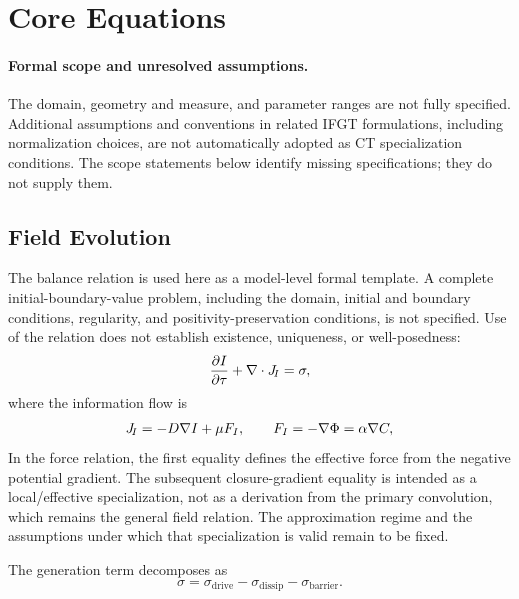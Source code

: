 
\section{Core Equations}
\label{sec:core}

\paragraph{Formal scope and unresolved assumptions.}
The domain, geometry and measure, and parameter ranges are not fully
specified. Additional assumptions and conventions in related IFGT
formulations, including normalization choices, are not automatically
adopted as CT specialization conditions. The scope statements below
identify missing specifications; they do not supply them.

\subsection{Field Evolution}

The balance relation is used here as a model-level formal template.
A complete initial-boundary-value problem, including the domain,
initial and boundary conditions, regularity, and positivity-preservation
conditions, is not specified. Use of the relation does not establish
existence, uniqueness, or well-posedness:
\begin{equation}
  \frac{\partial I}{\partial\tau} + \nabla\cdot J_{\!I} = \sigma,
  \label{eq:I_evolution}
\end{equation}
where the information flow is
\begin{equation}
  J_{\!I} = -D\nabla I + \mu F_I, \qquad F_I = -\nabla\Phi = \alpha\nabla C,
  \label{eq:JI}
\end{equation}
In the force relation, the first equality defines the effective force
from the negative potential gradient. The subsequent closure-gradient
equality is intended as a local/effective specialization, not as a
derivation from the primary convolution, which remains the general
field relation. The approximation regime and the assumptions under
which that specialization is valid remain to be fixed.

The generation term decomposes as
\begin{equation}
  \sigma = \sigma_{\mathrm{drive}} - \sigma_{\mathrm{dissip}} - \sigma_{\mathrm{barrier}}.
  \label{eq:sigma}
\end{equation}

